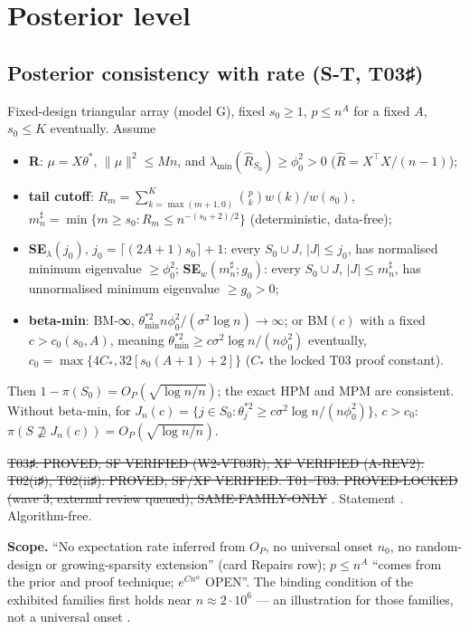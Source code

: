 \section{Posterior level}\label{sec:posterior}

\subsection{Posterior consistency with rate (S-T, T03♯)}
\begin{theorem}[S-T / T03♯; card TH09]\label{thm:ST}
Fixed-design triangular array (model G), fixed $s_0\ge1$, $p\le n^A$ for a fixed $A$, $s_0\le K$ eventually. Assume
\begin{itemize}
\item \textbf{R}: $\mu=X\theta^*$, $\|\mu\|^2\le Mn$, and $\lambda_{\min}(\hat{R}_{S_0})\ge\phi_0^2>0$ ($\hat{R}=X^\top X/(n-1)$);
\item \textbf{tail cutoff}: $R_m=\sum_{k=\max(m+1,0)}^{K}\binom pk w(k)/w(s_0)$, $m^\sharp_n=\min\{m\ge s_0:R_m\le n^{-(s_0+2)/2}\}$ (deterministic, data-free);
\item \textbf{SE$_\lambda(j_0)$}, $j_0=\lceil(2A+1)s_0\rceil+1$: every $S_0\cup J$, $|J|\le j_0$, has normalised minimum eigenvalue $\ge\phi_0^2$; \textbf{SE$_w(m^\sharp_n;g_0)$}: every $S_0\cup J$, $|J|\le m^\sharp_n$, has unnormalised minimum eigenvalue $\ge g_0>0$;
\item \textbf{beta-min}: BM-∞, $\theta^{*2}_{\min}n\phi_0^2/(\sigma^2\log n)\to\infty$; or BM$(c)$ with a fixed $c>c_0(s_0,A)$, meaning $\theta_{\min}^{*2}\ge c\sigma^2\log n/(n\phi_0^2)$ eventually, $c_0=\max\{4C_*,32[s_0(A+1)+2]\}$ ($C_*$ the locked T03 proof constant).
\end{itemize}
Then $1-\pi(S_0)=O_P(\sqrt{\log n/n})$; the exact HPM and MPM are consistent. Without beta-min, for $J_n(c)=\{j\in S_0:\theta_j^{*2}\ge c\sigma^2\log n/(n\phi_0^2)\}$, $c>c_0$: $\pi(S\not\supseteq J_n(c))=O_P(\sqrt{\log n/n})$.
\end{theorem}
\begin{statusbox}
\st{T03♯: PROVED; SF VERIFIED (W2-VT03R); XF VERIFIED (A-REV2). T02(i♯), T02(ii♯): PROVED; SF/XF VERIFIED. T01–T03: PROVED-LOCKED (wave 3; external review queued), SAME-FAMILY-ONLY} . Statement . Algorithm-free.
\end{statusbox}
\textbf{Scope.} ``No expectation rate inferred from $O_P$, no universal onset $n_0$, no random-design or growing-sparsity extension'' (card Repairs row); $p\le n^A$ ``comes from the prior and proof technique; $e^{Cn^\alpha}$ OPEN''. The binding condition of the exhibited families first holds near $n\approx2\cdot10^6$ — an illustration for those families, not a universal onset .

